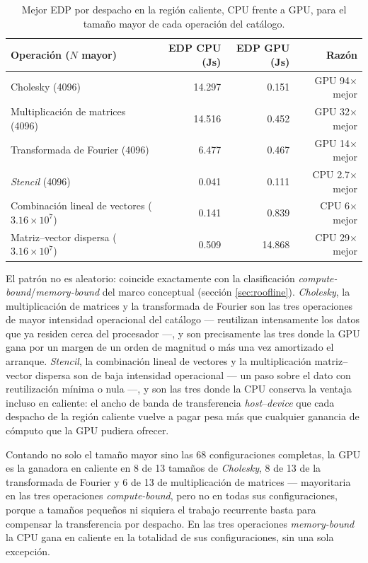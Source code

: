 \documentclass[12pt,oneside,spanish]{book}
\begin{document}
\begin{table}[H]
\centering
\caption[EDP en región caliente, CPU vs. GPU]{Mejor EDP por despacho en la región caliente, CPU frente a GPU, para el tamaño mayor de cada operación del catálogo.}
\label{tab:warm-cpu-vs-gpu}
\begin{tabular}{lrrr}
\toprule
\textbf{Operación ($N$ mayor)} & \textbf{EDP CPU (Js)} & \textbf{EDP GPU (Js)} & \textbf{Razón} \\
\midrule
Cholesky (4096)                  & 14.297 & 0.151  & GPU 94$\times$ mejor \\
Multiplicación de matrices (4096) & 14.516 & 0.452  & GPU 32$\times$ mejor \\
Transformada de Fourier (4096)    & 6.477  & 0.467  & GPU 14$\times$ mejor \\
\textit{Stencil} (4096)           & 0.041  & 0.111  & CPU 2.7$\times$ mejor \\
Combinación lineal de vectores ($3.16\times10^{7}$) & 0.141 & 0.839 & CPU 6$\times$ mejor \\
Matriz--vector dispersa ($3.16\times10^{7}$)        & 0.509 & 14.868 & CPU 29$\times$ mejor \\
\bottomrule
\end{tabular}
\end{table}

El patrón no es aleatorio: coincide exactamente con la clasificación \textit{compute-bound}/\textit{memory-bound} del marco conceptual (sección \ref{sec:roofline}). \textit{Cholesky}, la multiplicación de matrices y la transformada de Fourier son las tres operaciones de mayor intensidad operacional del catálogo --- reutilizan intensamente los datos que ya residen cerca del procesador ---, y son precisamente las tres donde la GPU gana por un margen de un orden de magnitud o más una vez amortizado el arranque. \textit{Stencil}, la combinación lineal de vectores y la multiplicación matriz--vector dispersa son de baja intensidad operacional --- un paso sobre el dato con reutilización mínima o nula ---, y son las tres donde la CPU conserva la ventaja incluso en caliente: el ancho de banda de transferencia \textit{host}--\textit{device} que cada despacho de la región caliente vuelve a pagar pesa más que cualquier ganancia de cómputo que la GPU pudiera ofrecer.

Contando no solo el tamaño mayor sino las 68 configuraciones completas, la GPU es la ganadora en caliente en 8 de 13 tamaños de \textit{Cholesky}, 8 de 13 de la transformada de Fourier y 6 de 13 de multiplicación de matrices --- mayoritaria en las tres operaciones \textit{compute-bound}, pero no en todas sus configuraciones, porque a tamaños pequeños ni siquiera el trabajo recurrente basta para compensar la transferencia por despacho. En las tres operaciones \textit{memory-bound} la CPU gana en caliente en la totalidad de sus configuraciones, sin una sola excepción.
\end{document}
